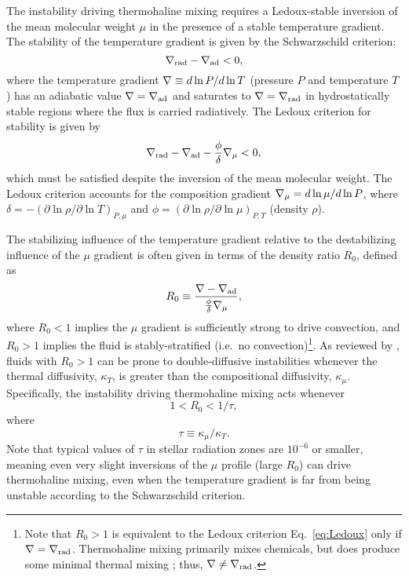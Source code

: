 %
%
The instability driving thermohaline mixing requires a Ledoux-stable inversion of the mean molecular weight $\mu$ in the presence of a stable temperature gradient. 
The stability of the temperature gradient is given by the Schwarzschild criterion:
\begin{equation} \label{eq:Schwarzschild}
    \gradrad - \gradad < 0,
\end{equation}
where the temperature gradient $\nabla \equiv d \ln P / d \ln T$ (pressure $P$ and temperature $T$) has an adiabatic value $\nabla = \nabla_{\rm{ad}}$ and saturates to $\nabla = \nabla_{\rm{rad}}$ in hydrostatically stable regions where the flux is carried radiatively. 
The Ledoux criterion for stability is given by \citep{Ledoux1947}
\begin{equation} \label{eq:Ledoux}
    \gradrad - \gradad - \frac{\phi}{\delta}\gradmu < 0,
\end{equation}
which must be satisfied despite the inversion of the mean molecular weight.
The Ledoux criterion accounts for the composition gradient $\nabla_{\mu} = d\ln\mu/d\ln P$, where $\delta = -(\partial \ln \rho / \partial \ln T)_{P,\mu}$ and $\phi = (\partial \ln \rho / \partial \ln\mu)_{P,T}$ (density $\rho$).

The stabilizing influence of the temperature gradient relative to the destabilizing influence of the $\mu$ gradient is often given in terms of the density ratio $R_0$, defined as
\begin{equation} \label{eq:R0}
    R_0 \equiv \frac{\grad - \gradad}{\frac{\phi}{\delta} \gradmu},
\end{equation}
where $R_0 < 1$ implies the $\mu$ gradient is sufficiently strong to drive convection, and $R_0 > 1$ implies the fluid is stably-stratified (i.e.~no convection)\footnote{Note that $R_0>1$ is equivalent to the Ledoux criterion Eq.~\eqref{eq:Ledoux} only if $\nabla = \nabla_{\rm{rad}}$. Thermohaline mixing primarily mixes chemicals, but does produce some minimal thermal mixing \citep[see, e.g., Fig.~4 of][]{brown_etal_2013}; thus, $\nabla \neq \nabla_{\rm{rad}}$.}. 
As reviewed by \citet{garaud_DDC_review_2018}, fluids with $R_0 > 1$ can be prone to double-diffusive instabilities whenever the thermal diffusivity, $\kappa_T$, is greater than the compositional diffusivity, $\kappa_\mu$. Specifically, the instability driving thermohaline mixing acts whenever
\begin{equation} \label{eq:R0_condition}
1 < R_0 < 1/\tau,
\end{equation}
\citep{baines_gill_1969} where
\begin{equation} \label{eq:tau}
    \tau \equiv \kappa_\mu/\kappa_T.
\end{equation}
Note that typical values of $\tau$ in stellar radiation zones are $10^{-6}$ or smaller, meaning even very slight inversions of the $\mu$ profile (large $R_0$) can drive thermohaline mixing, even when the temperature gradient is far from being unstable according to the Schwarzschild criterion.

